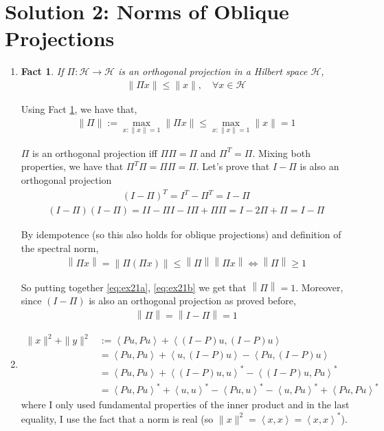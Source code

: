 \documentclass{article}
\providecommand{\lin}[1]{\ensuremath{\left\langle #1 \right\rangle}}
\providecommand{\norm}[1]{\ensuremath{\left\lVert#1\right\rVert}}
\newtheorem{fact}{Fact}
\begin{document}
\section*{Solution 2: Norms of Oblique Projections}
\begin{enumerate}[label=(\roman*)]
    \item
    \begin{fact}
        If $\Pi :\mathcal{H} \to \mathcal{H}$ is an orthogonal projection in a Hilbert space $\mathcal{H}$,
        \begin{align}
            \|\Pi x\|\leq \|x\|, \quad \forall x\in \mathcal{H}
        \end{align}
        \label{cl:1}
    \end{fact}
    
    Using Fact \ref{cl:1}, we have that,
    \begin{align}
        \|\Pi \|:= \max_{x:\|x\|=1} \|\Pi x\| \leq \max_{x:\|x\|=1} \|x\|=1
        \label{eq:ex21a}
    \end{align}
    
    $\Pi$ is an orthogonal projection iff $\Pi \Pi = \Pi$ and $\Pi^T = \Pi$. Mixing both properties, we have that $\Pi^T \Pi = \Pi \Pi = \Pi$. Let's prove that $I-\Pi$ is also an orthogonal projection
    \begin{align}
        (I- \Pi)^T = I^T - \Pi^T = I - \Pi
    \end{align}
    \begin{align}
        (I- \Pi)(I-\Pi) = I I - \Pi I - I \Pi + \Pi \Pi = I - 2\Pi + \Pi = I - \Pi
    \end{align}
    
    By idempotence (so this also holds for oblique projections) and definition of the spectral norm,
    \begin{align}
        \norm{\Pi x} = \norm{\Pi (\Pi x)} \leq \norm{\Pi} \norm{\Pi x} \Longleftrightarrow \norm{\Pi} \geq 1
        \label{eq:ex21b}
    \end{align}
    
    So putting together \eqref{eq:ex21a}, \eqref{eq:ex21b} we get that $\norm{\Pi} = 1$. Moreover, since $(I-\Pi)$ is also an orthogonal projection as proved before,
    \begin{align}
        \norm{\Pi} = \norm{I - \Pi} = 1
    \end{align}
    \item
    \begin{align}
        \|x\|^2 + \|y\|^2 &:= \lin{Pu, Pu} + \lin{(I-P)u, (I-P)u}  \\   
        &= \lin{Pu, Pu} + \lin{u, (I-P)u}  - \lin{Pu, (I-P)u} \\
        &= \lin{Pu, Pu} + \lin{(I-P)u, u}^*  - \lin{(I-P)u, Pu}^* \\
        &= \lin{Pu, Pu}^* + \lin{u, u}^*- \lin{Pu, u}^*  - \lin{u, Pu}^* + \lin{Pu, Pu}^*
        \label{eq:ex221}
    \end{align}
    where I only used fundamental properties of the inner product and in the last equality, I use the fact that a norm is real (so $\|x\|^2 = \lin{x,x} = \lin{x,x}^*$).
    

\end{enumerate}
\end{document}
